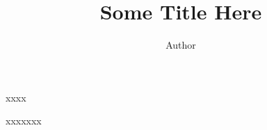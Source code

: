 

\title{Some Title Here}
\author{Author}









\begin{abstract}
	\myabstract
	\abstractsignature
\end{abstract}

\begin{frontmatter}
\maketitle


\begin{dedication}
\null\vfil
{\large
\begin{center}
xxxx
\end{center}}
\vfil\null
\end{dedication}

\begin{acknowledgments}
xxxxxxx
\end{acknowledgments}

\tableofcontents
\listoffigures
\listoftables

    \newpage
    \begin{inlineabstract}
		\begin{small}
		\myabstract
		\end{small}
		\abstractsignature
    \end{inlineabstract}

\end{frontmatter}
